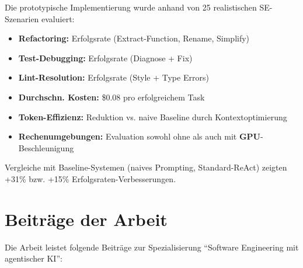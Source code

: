 Die prototypische Implementierung wurde anhand von 25 realistischen SE-Szenarien evaluiert:

\begin{itemize}
  \item \textbf{Refactoring:}  Erfolgsrate (Extract-Function, Rename, Simplify)
  \item \textbf{Test-Debugging:}  Erfolgsrate (Diagnose + Fix)
  \item \textbf{Lint-Resolution:}  Erfolgsrate (Style + Type Errors)
  \item \textbf{Durchschn. Kosten:} \$0.08 pro erfolgreichem Task
  \item \textbf{Token-Effizienz:}  Reduktion vs. naive Baseline durch Kontextoptimierung
  \item \textbf{Rechenumgebungen:} Evaluation sowohl ohne als auch mit \textbf{GPU}-Beschleunigung
\end{itemize}

Vergleiche mit Baseline-Systemen (naives Prompting, Standard-ReAct) zeigten +31\% bzw. +15\% Erfolgsraten-Verbesserungen.

\section{Beiträge der Arbeit}

Die Arbeit leistet folgende Beiträge zur Spezialisierung \enquote{Software Engineering mit agentischer KI}:

